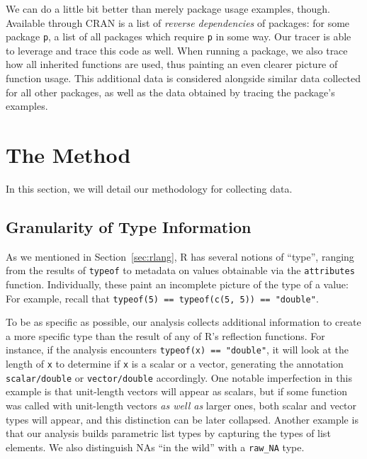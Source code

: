 \documentclass[acmsmall,10pt,review,anonymous]{acmart}\settopmatter{printfolios=true,printccs=false,printacmref=false}
\newcommand{\code}[1]{\lstinline|#1|\xspace}
\begin{document}
We can do a little bit better than merely package usage examples, though.
Available through CRAN is a list of {\it reverse dependencies} of packages: 
for some package {\tt p}, a list of all packages which require {\tt p} in some way.  
Our tracer is able to leverage and trace this code as well. 
When running a package, we also trace how all inherited functions are used, thus painting an even clearer picture of function usage.  
This additional data is considered alongside similar data collected for all other packages, as well as the data obtained by tracing the package's examples.



\section{The Method}

In this section, we will detail our methodology for collecting data.

%
%
%
%
\subsection{Granularity of Type Information}

As we mentioned in Section~\ref{sec:rlang}, R has several notions of ``type'', ranging from the results of \code{typeof} to metadata on values obtainable via the \code{attributes} function.
Individually, these paint an incomplete picture of the type of a value:
For example, recall that \code{typeof(5) == typeof(c(5, 5)) == "double"}.

To be as specific as possible, our analysis collects additional information to create a more specific type than the result of any of R's reflection functions.
For instance, if the analysis encounters {\tt typeof(x) == "double"}, it will look at the length of {\tt x} to determine if {\tt x} is a scalar or a vector, generating the annotation {\tt scalar/double} or {\tt vector/double} accordingly. 
One notable imperfection in this example is that unit-length vectors will appear as scalars, but if some function was called with unit-length vectors {\it as well as} larger ones, both scalar and vector types will appear, and this distinction can be later collapsed.
Another example is that our analysis builds parametric list types by capturing the types of list elements.
We also distinguish NAs ``in the wild'' with a {\tt raw\_NA} type.
\end{document}
